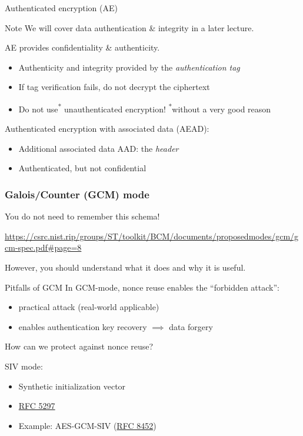 \begin{frame}{Authenticated encryption (AE)}
  \begin{block}{Note}
    We will cover data authentication \& integrity in a later lecture.
  \end{block}

  \vspace*{0.5em}
  
  AE provides confidentiality \& authenticity.
  \begin{itemize}[<+(1)->]
    \item Authenticity and integrity provided by the \emph{authentication tag}
    \item If tag verification fails, do not decrypt the ciphertext
    \item Do not use\textsuperscript{*} unauthenticated encryption! \hspace{1em} {\scriptsize\textsuperscript{*}without a very good reason}
  \end{itemize}

  \vspace*{1em}

  \pause
  Authenticated encryption with associated data (AEAD):
  \begin{itemize}[<+(1)->]
    \item Additional associated data AAD: the \emph{header}
    \item Authenticated, but not confidential
  \end{itemize}
\end{frame}

\begin{frame}
  \frametitle{Galois/Counter (GCM) mode}

  You do not need to remember this schema!
  \begin{center}
    \url{https://csrc.nist.rip/groups/ST/toolkit/BCM/documents/proposedmodes/gcm/gcm-spec.pdf\#page=8}
  \end{center}
  \pause
  However, you should understand what it does and why it is useful.
\end{frame}

\begin{frame}{Pitfalls of GCM}
  In GCM-mode, nonce reuse enables the \enquote{forbidden attack}:
  \begin{itemize}[<+(1)->]
    \item practical attack (real-world applicable)
    \item enables authentication key recovery $\implies$ data forgery
  \end{itemize}

  \pause
  How can we protect against nonce reuse?

  \pause
  SIV mode:
  \begin{itemize}[<+->]
    \item Synthetic initialization vector
    \item \href{https://datatracker.ietf.org/doc/html/rfc5297}{RFC 5297}
    \item Example: AES-GCM-SIV (\href{https://datatracker.ietf.org/doc/html/rfc8452}{RFC 8452})
  \end{itemize}
\end{frame}

